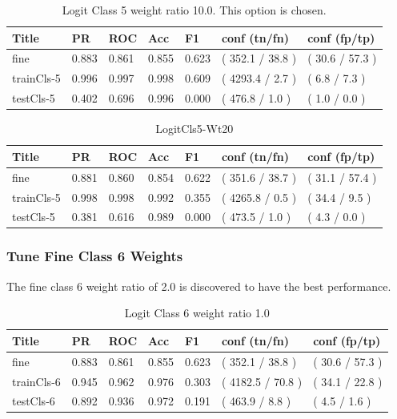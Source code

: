\documentclass[ms]{nuthesis}
\begin{document}
\FloatBarrier
\begin{table}[H]
\centering
\caption{Logit Class 5 weight ratio 10.0. This option is chosen.}
\label{tab:LogRegCls5-Wt10}
\begin{tabular}{|l||l||l||l||l||l||l|}\toprule
Title & PR & ROC & Acc & F1 & conf (tn/fn) & conf (fp/tp) \\ \midrule
fine & 0.883 & 0.861 & 0.855 & 0.623 & ( 352.1 / 38.8 ) & ( 30.6 / 57.3 ) \\
trainCls-5 & 0.996 & 0.997 & 0.998 & 0.609 & ( 4293.4 / 2.7 ) & ( 6.8 / 7.3 ) \\
testCls-5 & 0.402 & 0.696 & 0.996 & 0.000 & ( 476.8 / 1.0 ) & ( 1.0 / 0.0 ) \\ \bottomrule
\end{tabular}
\end{table}
\FloatBarrier

\FloatBarrier
\begin{table}[H]
\centering
\caption{LogitCls5-Wt20}
\label{tab:LogRegCls5-Wt20}
\begin{tabular}{|l||l||l||l||l||l||l|}\toprule
Title & PR & ROC & Acc & F1 & conf (tn/fn) & conf (fp/tp) \\ \midrule
fine & 0.881 & 0.860 & 0.854 & 0.622 & ( 351.6 / 38.7 ) & ( 31.1 / 57.4 ) \\
trainCls-5 & 0.998 & 0.998 & 0.992 & 0.355 & ( 4265.8 / 0.5 ) & ( 34.4 / 9.5 ) \\
testCls-5 & 0.381 & 0.616 & 0.989 & 0.000 & ( 473.5 / 1.0 ) & ( 4.3 / 0.0 ) \\ \bottomrule
\end{tabular}
\end{table}
\FloatBarrier

\subsubsection{Tune Fine Class 6 Weights}
\par The fine class 6 weight ratio of 2.0 is discovered to have the best performance.
\FloatBarrier
\begin{table}[H]
\centering
\caption{Logit Class 6 weight ratio 1.0}
\label{tab:LogRegCls6-Wt1}
\begin{tabular}{|l||l||l||l||l||l||l|}\toprule
Title & PR & ROC & Acc & F1 & conf (tn/fn) & conf (fp/tp) \\ \midrule
fine & 0.883 & 0.861 & 0.855 & 0.623 & ( 352.1 / 38.8 ) & ( 30.6 / 57.3 ) \\
trainCls-6 & 0.945 & 0.962 & 0.976 & 0.303 & ( 4182.5 / 70.8 ) & ( 34.1 / 22.8 ) \\
testCls-6 & 0.892 & 0.936 & 0.972 & 0.191 & ( 463.9 / 8.8 ) & ( 4.5 / 1.6 ) \\ \bottomrule
\end{tabular}
\end{table}
\FloatBarrier
\end{document}
